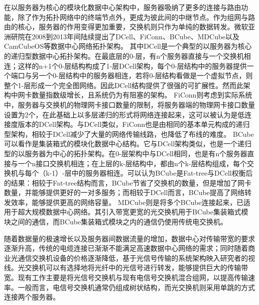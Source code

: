 在以服务器为核心的模块化数据中心架构中，服务器吸纳了更多的连接与路由功能，除了作为拓扑网络中的终端节点外，更成为彼此间的中继节点。作为组网与路由的核心，服务器的作用变得更加重要，交换机则只作为单纯的数据转发。微软亚洲研院在2008到2013年间陆续提出了DCell\cite{guo2008dcell}、FiConn\cite{li2009ficonn}、BCube\cite{guo2009bcube}、MDCube\cite{wu2009mdcube}以及CamCubeOS\cite{costa2013camcubeos}等数据中心网络拓扑架构。
其中DCell\cite{guo2008dcell}是一个典型的以服务器为核心的递归型数据中心拓扑架构。在最底层的0-层，有n个服务器直接与一个交换机相连；这样的n+1个0-层结构构成了1-层DCell架构，每个0-层结构中的服务器提供一个端口与另一个0-层结构中的服务器相连，若将0-层结构看做是一个虚拟节点，则整个1-层形成一个完全图网络。因此DCell结构提供了很强的可扩展性。然而此架构中网卡数量指数级增长，且系统仍为有阻塞的架构。
FiConn\cite{li2009ficonn}则考虑到实际系统中，服务器与交换机的物理网卡接口数量的限制，将服务器端的物理网卡接口数量设置为2个，在此基础上以多层递归的形式将网络连接起来，这可以被认为是低连接度版本的DCell架构。与DCell类似，FiConn也是由相同的基本单元构成的递归型架构，相较于DCell减少了大量的网络传输线路，也降低了布线的难度。
BCube\cite{guo2009bcube}可以看作是集装箱式的模块化数据中心结构。它与DCell架构类似，也是一个递归型的以服务器为中心的拓扑架构。在0-层架构中与DCell相同，也是有n个服务器直接与一个n接口交换机相连；在上层的k-层结构中，都由n个k-层结构组成，每个交换机与每个（k-1）-层中的服务器相连。可以认为BCube是Fat-tree与DCell权衡后的结果：相较于Fat-tree结构而言，BCube节省了交换机的数量，但是增加了网卡数量，并能够提供更好的一对多服务；而相较于DCell而言，BCube提高了网络转发效率，能够提供更高的网络容量。
MDCube\cite{wu2009mdcube}则是将多个BCube连接起来，已适用于超大规模数据中心网络。其引入带宽更宽的光交换机用于BCube集装箱式模块之间的通信，而BCube集装箱式模块之内的通信仍使用传统电交换机。

随着数据量的极速增长以及服务器间数据流量的增加，数据中心对传输带宽的要求逐渐升高，传统的电缆连接已渐渐不能满足高速数据中心网络的需求；同时随着商业光通信交换机设备的价格逐渐降低，基于光信号传输的系统架构映入研究者的视线。光交换机可以有选择地将光纤中的光信号进行转发，能够提供巨大的传输带宽。现有工作主要是将光信号交换机与现有电信号交换机混合组网，以提高传输速率。一般而言，电信号交换机通常仍组成树状结构，而光交换机则采用单跳的方式连接两个服务器。

